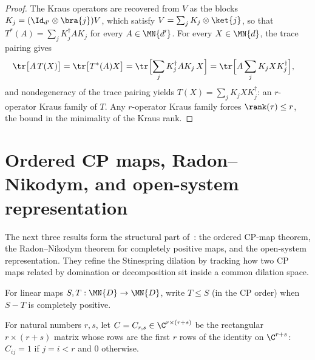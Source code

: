 \begin{proof}
    \leanok
    The Kraus operators are recovered from $V$ as the blocks
    $K_j=(\Id_{d'}\otimes\bra{j})V$, which satisfy
    $V=\sum_jK_j\otimes\ket{j}$, so that
    $T^*(A)=\sum_jK_j^\dagger AK_j$ for every $A\in\MN{d'}$. For every
    $X\in\MN{d}$, the trace pairing gives
    \begin{align}
        \tr\bigl[A\,T(X)\bigr]
        &=\tr\bigl[T^*(A)X\bigr]
          =\tr\Bigl[\sum_jK_j^\dagger AK_j\,X\Bigr]
          =\tr\Bigl[A\sum_jK_jXK_j^\dagger\Bigr],
        \label{eq:stinespring_rectangular_least_pairing}
    \end{align}
    and nondegeneracy of the trace pairing yields
    $T(X)=\sum_jK_jXK_j^\dagger$: an $r$-operator Kraus family of $T$. Any
    $r$-operator Kraus family forces $\rank(\tau)\le r$, the bound in the
    minimality of the Kraus rank.
\end{proof}

\section{Ordered CP maps, Radon--Nikodym, and open-system representation}
\label{sec:ordered_cp}

The next three results form the structural part of~\cite[Theorems~2.3--2.5]{Wolf2012Quantum}:
the ordered CP-map theorem, the Radon--Nikodym theorem for completely positive
maps, and the open-system representation. They refine the Stinespring dilation
by tracking how two CP maps related by domination or decomposition sit inside
a common dilation space.

\begin{definition}\label{def:cp_dominates}
    \leanok
    For linear maps $S,T:\MN{D}\to\MN{D}$, write $T\le S$ (in the CP
    order) when $S-T$ is completely positive.
\end{definition}

\begin{definition}\label{def:block_top_rows}
    \leanok
    For natural numbers $r,s$, let $C=C_{r,s}\in\C^{r\times(r+s)}$ be the
    rectangular $r\times(r+s)$ matrix whose rows are the first $r$ rows
    of the identity on $\C^{r+s}$: $C_{ij}=1$ if $j=i<r$ and $0$
    otherwise.
\end{definition}

